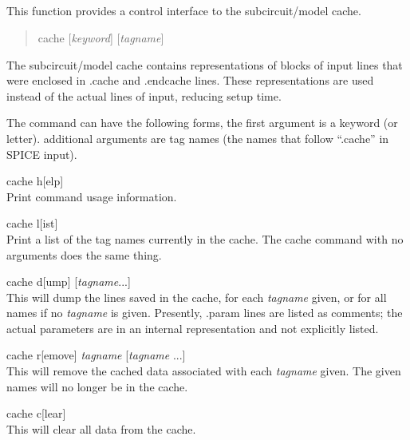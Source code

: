 \subsection{}


This function provides a control interface to the subcircuit/model cache.
\begin{quote}\vt
cache [{\it keyword\/}] [{\it tagname\/}]
\end{quote}

The subcircuit/model cache contains representations of blocks of input
lines that were enclosed in {\vt .cache} and {\vt .endcache} lines. 
These representations are used instead of the actual lines of input,
reducing setup time.

The command can have the following forms, the first argument is a
keyword (or letter).  additional arguments are tag names (the names
that follow ``{\vt .cache}'' in SPICE input).

\begin{description}
\item{\vt cache h}[{\vt elp}]\\
Print command usage information.
\item{\vt cache l}[{\vt ist}]\\
Print a list of the tag names currently in the cache.  The
{\cb cache} command with no arguments does the same thing.
\item{\vt cache d}[{\vt ump}] [{\it tagname}...]\\
This will dump the lines saved in the cache, for each
{\it tagname} given, or for all names if no {\it tagname} is
given.  Presently, {\vt .param} lines are listed as comments; 
the actual parameters are in an internal representation and not
explicitly listed.
\item{\vt cache r}[{\vt emove}] {\it tagname} [{\it tagname} ...]\\
This will remove the cached data associated with each
{\it tagname} given.  The given names will no longer be in the cache.
\item{\vt cache c}[{\vt lear}]\\
This will clear all data from the cache.
\end{description}

\subsection{}
\label{checkcom}


